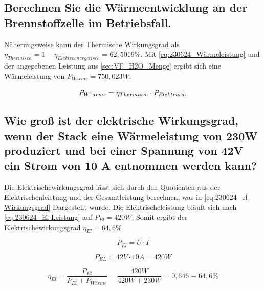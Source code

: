 \subsection{Berechnen Sie die Wärmeentwicklung an der Brennstoffzelle im Betriebsfall.}

Näherungsweise kann der Thermische Wirkungsgrad als $\eta_{Thermisch} = 1 - \eta_{Elektroenergetisch} = 62,5019 \%$.
Mit \autoref{eq:230624_Wärmeleistung} und der angegebenen Leistung aus \autoref{sec:VF_H2O_Menge} ergibt sich eine Wärmeleistung von $P_{Wärme} = 750,023 W$. 

\begin{equation}
    P_{W"arme} = \eta_{Thermisch} \cdot P_{Elektrisch}
    \label{eq:230624_Wärmeleistung}
\end{equation}

\subsection{Wie groß ist der elektrische Wirkungsgrad, wenn der Stack eine Wärmeleistung von
230W produziert und bei einer Spannung von 42V ein Strom von 10 A entnommen werden kann?}

Die Elektrischewirkungsgrad lässt sich durch den Quotienten aus der Elektrischenleistung und der Gesamtleistung berechnen, was in \autoref{eq:230624_el-Wirkungsgrad} Dargestellt wurde. 
Die Elektrischeleistung bläuft sich nach \autoref{eq:230624_El-Leistung} auf $P_{El} = 420W$. Somit ergibt der Elektrischewirkungsgrad $\eta_{El} = 64,6\%$

\begin{equation}
    P_{El} = U \cdot I
    \label{eq:230624_El-Leistung}
\end{equation}

$$P_{EL} = 42V \cdot 10A = 420W$$

\begin{equation}
    \eta_{El} = \frac{P_{El}}{P_{El} + P_{Wärme}} = \frac{420 W}{420 W + 230 W} = 0,646 \equiv 64,6 \%
    \label{eq:230624_el-Wirkungsgrad}
\end{equation}
